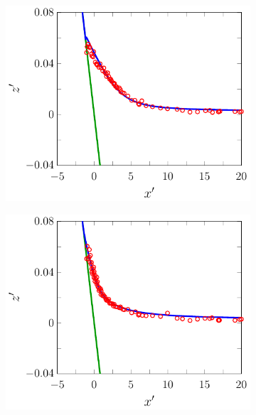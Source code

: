 \begin{figure}
\begin{subfigure}{0.5\textwidth}
		\includegraphics[width=\textwidth]{./chp6/figures/Experiment/Synolakis/H0p0185/FEVM/50s.pdf}
	\end{subfigure}%
	\begin{subfigure}{0.5\textwidth}
		\includegraphics[width=\textwidth]{./chp6/figures/Experiment/Synolakis/H0p0185/FEVM/60s.pdf}
			\end{subfigure}
	\begin{subfigure}{0.5\textwidth}

\end{subfigure}
\end{figure}

